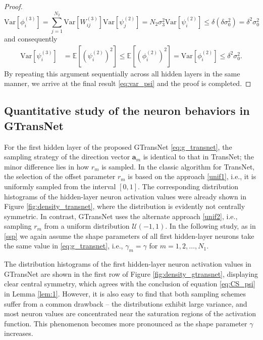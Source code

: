 \documentclass{article}
\begin{document}
\begin{proof}
\begin{equation}
\mathrm{Var}\left[\phi_i^{(3)}\right]
= \textstyle\sum\limits_{j=1}^{N_2}\mathrm{Var}\left[W_{ij}^{(3)}\right]\mathrm{Var}\left[\psi_j^{(2)}\right]
= N_2 \sigma_3^2 \mathrm{Var}\left[\psi_i^{(2)}\right]
\le \delta(\delta \sigma_0^2)= \delta^2 \sigma_0^2
\end{equation}
and consequently
\begin{equation}
\begin{aligned}
\mathrm{Var}\left[\psi_i^{(3)}\right]
&= \mathbb{E}\left[\left(\psi_i^{(2)}\right)^2\right]
\le \mathbb{E}\left[\left(\phi_i^{(2)}\right)^2\right]
= \mathrm{Var}\left[\phi_i^{(2)}\right] 
\leq \delta^2 \sigma_0^2.
\end{aligned}
\end{equation}
By repeating this argument sequentially across all  hidden layers in the same manner, we arrive at the final result \eqref{eq:var_psi} and the proof is completed.
\end{proof}


\subsection{Quantitative study of the neuron behaviors in GTransNet}
For the first hidden layer of the proposed GTransNet \eqref{eq:g_transnet}, the sampling strategy of the direction vector $\mathbf{a}_m$ is identical to that in TransNet; the minor difference lies in how $r_m$ is sampled. In the classic algorithm for TransNet, the selection of the offset parameter $r_m$ is based on the approach \eqref{unif1}, i.e., it is uniformly sampled from the interval $[0,1]$. The corresponding distribution histograms of the hidden-layer neuron activation values were already shown in Figure \ref{fig:density_transnet}, where the distribution is evidently not centrally symmetric. In contrast, GTransNet uses the alternate approach \eqref{unif2}, i.e., sampling $r_m$ from a uniform distribution $\mathcal{U}(-1,1)$. In the following study, as in \eqref{ssp} we again assume the shape parameters of all first hidden-layer neurons take the same value in \eqref{eq:g_transnet}, i.e., $\gamma_m = \gamma$ for $m = 1,2,\ldots,N_1$.


The distribution histograms of the first hidden-layer neuron activation values in GTransNet are shown in the first row of Figure \ref{fig:density_gtransnet}, displaying clear central symmetry, which agrees with the conclusion of equation \eqref{eq:CS_psi} in Lemma \ref{lem:1}. However, it is also easy to find that both sampling schemes suffer from a common drawback -- the distributions exhibit large variance, and most neuron values are concentrated near the saturation regions of the activation function. This phenomenon becomes more pronounced as the shape parameter $\gamma$ increases.
\end{document}
